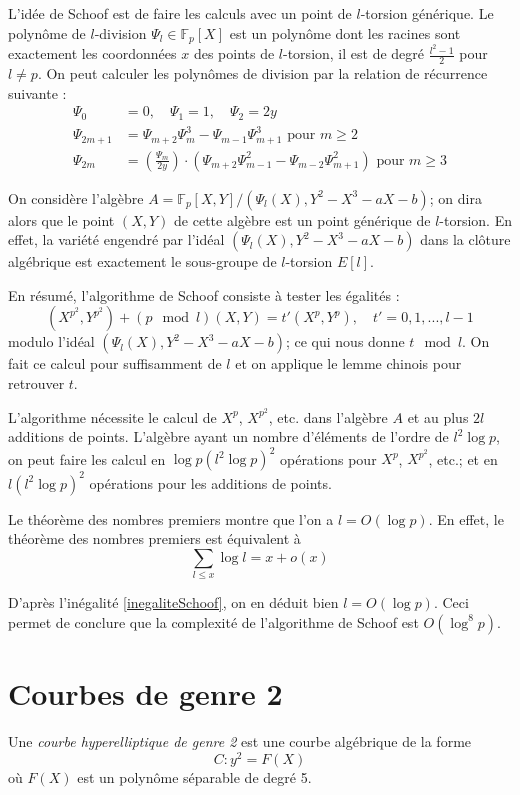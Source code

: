 \documentclass[a4paper]{article}
\theoremstyle{definition}
\theoremstyle{remark}
\numberwithin{equation}{section}
\begin{document}
L'idée de Schoof \cite{schoof} est de faire les calculs avec un point de $l$-torsion générique. Le polynôme de $l$-division $\Psi_l \in \mathbb{F}_p[X]$ est un polynôme dont les racines sont exactement les coordonnées $x$ des points de $l$-torsion, il est de degré $\frac{l^2-1}{2}$ pour $l \neq p$. On peut calculer les polynômes de division par la relation de récurrence suivante :
\begin{align*}
\Psi_{0} &= 0, \quad \Psi_{1} = 1, \quad \Psi_{2} = 2y \\
\Psi_{2m+1} &=  \Psi_{m+2} \Psi_{m}^{ 3}  -  \Psi_{m-1} \Psi ^{ 3}_{ m+1} \text{ pour } m \geq 2 \\
\Psi_{ 2m} &=  \left ( \frac { \Psi_{m}}{2y} \right ) \cdot ( \Psi_{m+2}\Psi^{ 2}_{m-1} -  \Psi_{m-2} \Psi ^{ 2}_{m+1})   \text{ pour } m \geq 3
\end{align*}

On considère l'algèbre $A=\mathbb{F}_p[X,Y]/(\Psi_l(X),Y^2-X^3-aX-b)$; on dira alors que le point $(X,Y)$ de cette algèbre est un point générique de $l$-torsion. En effet, la variété engendré par l'idéal $(\Psi_l(X),Y^2-X^3-aX-b)$ dans la clôture algébrique est exactement le sous-groupe de $l$-torsion $E[l]$.

En résumé, l'algorithme de Schoof consiste à tester les égalités :
\begin{equation}
(X^{p^2},Y^{p^2}) + (p \mod l)(X,Y) = t'(X^p,Y^p), \quad t' = 0,1,...,l-1
\end{equation}
modulo l'idéal $(\Psi_l(X),Y^2-X^3-aX-b)$; ce qui nous donne $t \mod l$. On fait ce calcul pour suffisamment de $l$ et on applique le lemme chinois pour retrouver $t$.

L'algorithme nécessite le calcul de $X^p$, $X^{p^2}$, etc. dans l'algèbre $A$ et au plus $2l$ additions de points. L'algèbre ayant un nombre d'éléments de l'ordre de $l^2\log p$, on peut faire les calcul en $\log p(l^2\log p)^2$ opérations pour $X^p$, $X^{p^2}$, etc.; et en $l(l^2\log p)^2$ opérations pour les additions de points.

Le théorème des nombres premiers montre que l'on a $l = O(\log p)$. En effet, le théorème des nombres premiers est équivalent à
$$\sum_{l \leq x}\log l = x + o(x)$$

D'après l'inégalité \ref{inegaliteSchoof}, on en déduit bien $l = O(\log p)$. Ceci permet de conclure que la complexité de l'algorithme de Schoof est $O(\log^8 p)$.

\section{Courbes de genre 2}
Une \emph{courbe hyperelliptique de genre 2} est une courbe algébrique de la forme
$$C : y^2 = F(X)$$
où $F(X)$ est un polynôme séparable de degré 5.
\end{document}
